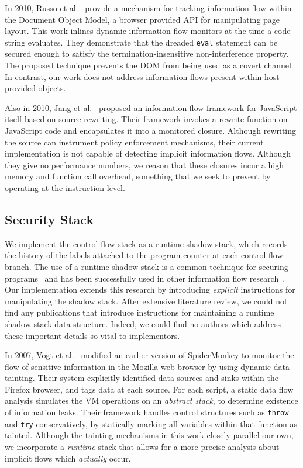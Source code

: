 In 2010, Russo et al.~\cite{1813092} provide a mechanism for tracking information flow within the Document Object Model, a browser provided API for manipulating page layout.
This work inlines dynamic information flow monitors at the time a code string evaluates.
They demonstrate that the dreaded \texttt{eval} statement can be secured enough to satisfy the termination-insensitive non-interference property.
The proposed technique prevents the DOM from being used as a covert channel.
In contrast, our work does not address information flows present within host provided objects.

Also in 2010, Jang et al.~\cite{1866339} proposed an information flow framework for JavaScript itself based on source rewriting.
Their framework invokes a rewrite function on JavaScript code and encapsulates it into a monitored closure.
Although rewriting the source can instrument policy enforcement mechanisms, their current implementation is not capable of detecting implicit information flows.
Although they give no performance numbers, we reason that these closures incur a high memory and function call overhead, something that we seek to prevent by operating at the instruction level.

\subsection{Security Stack}
\label{sec:relatedwork-security-stack}

We implement the control flow stack as a runtime shadow stack, which records the history of the labels attached to the program counter at each control flow branch.
The use of a runtime shadow stack is a common technique for securing programs~\cite{abadi2009control, frantzen2001stackghost, prasad2003binary} and has been successfully used in other information flow research~\cite{lam2006general}.
Our implementation extends this research by introducing \emph{explicit} instructions for manipulating the shadow stack.
After extensive literature review, we could not find any publications that introduce instructions for maintaining a runtime shadow stack data structure.
Indeed, we could find no authors which address these important details so vital to implementors.

In 2007, Vogt et al.~\cite{Vogt_CrossSiteScripting_2007} modified an earlier version of SpiderMonkey to monitor the flow of sensitive information in the Mozilla web browser by using dynamic data tainting.
Their system explicitly identified data sources and sinks within the Firefox browser, and tags data at each source.
For each script, a static data flow analysis simulates the VM operations on an \emph{abstract stack}, to determine existence of information leaks.
Their framework handles control structures such as \texttt{throw} and \texttt{try} conservatively, by statically marking all variables within that function as tainted.
Although the tainting mechanisms in this work closely parallel our own, we incorporate a \emph{runtime} stack that allows for a more precise analysis about implicit flows which \emph{actually} occur.


